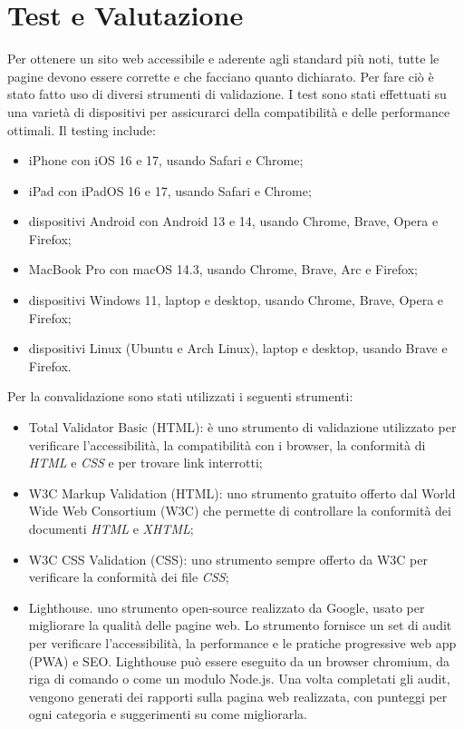 \documentclass[11pt]{article}
\begin{document}
\section{Test e Valutazione}
\label{sec:orge86cacb}
Per ottenere un sito web accessibile e aderente agli standard più noti, tutte le pagine devono essere corrette e che facciano quanto dichiarato. Per fare ciò è stato fatto uso di diversi strumenti di validazione. I test sono stati effettuati su una varietà di dispositivi per assicurarci della compatibilità e delle performance ottimali. Il testing include:
\begin{itemize}
\item iPhone con iOS 16 e 17, usando Safari e Chrome;
\item iPad con iPadOS 16 e 17, usando Safari e Chrome;
\item dispositivi Android con Android 13 e 14, usando Chrome, Brave, Opera e Firefox;
\item MacBook Pro con macOS 14.3, usando Chrome, Brave, Arc e Firefox;
\item dispositivi Windows 11, laptop e desktop, usando Chrome, Brave, Opera e Firefox;
\item dispositivi Linux (Ubuntu e Arch Linux), laptop e desktop, usando Brave e Firefox.
\end{itemize}
Per la convalidazione sono stati utilizzati i seguenti strumenti:
\begin{itemize}
\item Total Validator Basic (HTML): è uno strumento di validazione utilizzato per verificare l'accessibilità, la compatibilità con i browser, la conformità di \emph{HTML} e \emph{CSS} e per trovare link interrotti;
\item W3C Markup Validation (HTML): uno strumento gratuito offerto dal World Wide Web Consortium (W3C) che permette di controllare la conformità dei documenti \emph{HTML} e \emph{XHTML};
\item W3C CSS Validation (CSS): uno strumento sempre offerto da W3C per verificare la conformità dei file \emph{CSS};
\item Lighthouse. uno strumento open-source realizzato da Google, usato per migliorare la qualità delle pagine web. Lo strumento fornisce un set di audit per verificare l'accessibilità, la performance e le pratiche progressive web app (PWA) e SEO. Lighthouse può essere eseguito da un browser chromium, da riga di comando o come un modulo Node.js. Una volta completati gli audit, vengono generati dei rapporti sulla pagina web realizzata, con punteggi per ogni categoria e suggerimenti su come migliorarla.
\end{itemize}
\end{document}
